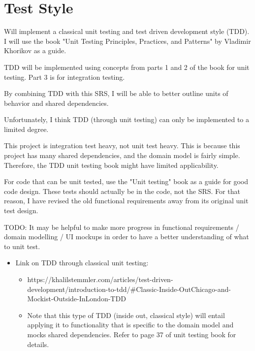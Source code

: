 \section{Test Style}

Will implement a classical unit testing and test driven development style (TDD). I will use the book "Unit Testing Principles, Practices, and Patterns" by Vladimir Khorikov as a guide.

TDD will be implemented using concepts from parts 1 and 2 of the book for unit testing. Part 3 is for integration testing.

By combining TDD with this SRS, I will be able to better outline units of behavior and shared dependencies.

Unfortunately, I think TDD (through unit testing) can only be implemented to a limited degree.

This project is integration test heavy, not unit test heavy. This is because this project has many shared dependencies, and the domain model is fairly simple. Therefore, the TDD unit testing book might have limited applicability. 

For code that can be unit tested, use the "Unit testing" book as a guide for good code design. These tests should actually be in the code, not the SRS. For that reason, I have revised the old functional requirements away from its original unit test design.

TODO: It may be helpful to make more progress in functional requirements / domain modelling / UI mockups in order to have a better understanding of what to unit test.


\begin{itemize}
\item Link on TDD through classical unit testing:
	\begin{itemize}
	\item https://khalilstemmler.com/articles/test-driven-development/introduction-to-tdd/\#Classic-Inside-OutChicago-and-Mockist-Outside-InLondon-TDD 
	\item Note that this type of TDD (inside out, classical style) will entail applying it to functionality that is specific to the domain model and mocks shared dependencies. Refer to page 37 of unit testing book for details. 
	\end{itemize}
\end{itemize}

